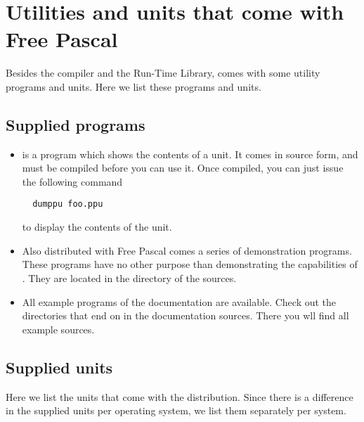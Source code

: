 \documentclass{report}
\begin{document}

\chapter{Utilities and units that come with Free Pascal}
Besides the compiler and the Run-Time Library, \fpc comes with some utility
programs and units. Here we list these programs and units. 

\section{Supplied programs}

\begin{itemize}
\item {} is a program which shows the contents of a \fpc unit. It
comes in source form, and must be compiled before you can use it. Once
compiled, you can just issue the following command
\begin{verbatim}
  dumppu foo.ppu
\end{verbatim}
to display the contents of the  unit.
\item Also distributed with Free Pascal comes a series of demonstration programs.
These programs have no other purpose than demonstrating the capabilities of
\fpc. They are located in the  directory of the sources.
\item All example programs of the documentation are available. Check out the
directories that end on  in the documentation sources. There you
wll find all example sources.
\end{itemize}


\section{Supplied units}
Here we list the units that come with the \fpc distribution. Since there is
a difference in the supplied units per operating system, we list them
separately per system.

%
%

\end{document}
